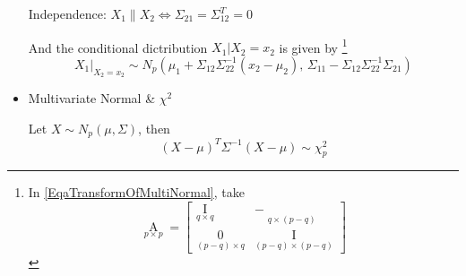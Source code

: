 \begin{itemize}[topsep=6pt,itemsep=4pt]
        Independence: $ X_1\parallel X_2\Leftrightarrow \Sigma _{21}=\Sigma _{12}^T=0  $

        And the conditional dictribution $ X_1|X_2=x_2 $ is given by \footnote{In \autoref{EqaTransformOfMultiNormal}, take 
        \begin{equation}
            \mathop{A}\limits_{p\times p}=\begin{bmatrix}
                \mathop{I}\limits_{q\times q} & -\mathop{\Sigma _{12}\Sigma _{22}^{-1}}\limits_{q\times (p-q)} \\
                \mathop{0}\limits_{(p-q)\times q}&\mathop{I}\limits_{(p-q)\times (p-q)}  
            \end{bmatrix}  
        \end{equation}
        
        }
        \begin{equation}\label{EquConditionalPrForGaussian}
            X_1|_{X_2=x_2}\sim N_p(\mu_1+\Sigma _{12}\Sigma _{22}^{-1}(x_2-\mu_2),\,\Sigma _{11}-\Sigma _{12}\Sigma _{22}^{-1}\Sigma _{21})
        \end{equation}

        \item Multivariate Normal \& $ \chi^2 $
        
         Let $ X\sim N_p(\mu,\Sigma ) $, then 
         \begin{equation}
             (X-\mu)^T\Sigma ^{-1}(X-\mu)\sim \chi_p^2 
         \end{equation}
         
        
        
        
        
        
        
    \end{itemize}
    
        







